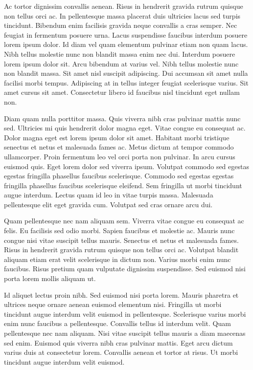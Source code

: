 \documentclass[11pt,a4paper]{article}
\begin{document}
Ac tortor dignissim convallis aenean. Risus in hendrerit gravida rutrum quisque non tellus orci ac. In pellentesque massa placerat duis ultricies lacus sed turpis tincidunt. Bibendum enim facilisis gravida neque convallis a cras semper. Nec feugiat in fermentum posuere urna. Lacus suspendisse faucibus interdum posuere lorem ipsum dolor. Id diam vel quam elementum pulvinar etiam non quam lacus. Nibh tellus molestie nunc non blandit massa enim nec dui. Interdum posuere lorem ipsum dolor sit. Arcu bibendum at varius vel. Nibh tellus molestie nunc non blandit massa. Sit amet nisl suscipit adipiscing. Dui accumsan sit amet nulla facilisi morbi tempus. Adipiscing at in tellus integer feugiat scelerisque varius. Sit amet cursus sit amet. Consectetur libero id faucibus nisl tincidunt eget nullam non.

Diam quam nulla porttitor massa. Quis viverra nibh cras pulvinar mattis nunc sed. Ultricies mi quis hendrerit dolor magna eget. Vitae congue eu consequat ac. Dolor magna eget est lorem ipsum dolor sit amet. Habitant morbi tristique senectus et netus et malesuada fames ac. Metus dictum at tempor commodo ullamcorper. Proin fermentum leo vel orci porta non pulvinar. In arcu cursus euismod quis. Eget lorem dolor sed viverra ipsum. Volutpat commodo sed egestas egestas fringilla phasellus faucibus scelerisque. Commodo sed egestas egestas fringilla phasellus faucibus scelerisque eleifend. Sem fringilla ut morbi tincidunt augue interdum. Lectus quam id leo in vitae turpis massa. Malesuada pellentesque elit eget gravida cum. Volutpat sed cras ornare arcu dui.

Quam pellentesque nec nam aliquam sem. Viverra vitae congue eu consequat ac felis. Eu facilisis sed odio morbi. Sapien faucibus et molestie ac. Mauris nunc congue nisi vitae suscipit tellus mauris. Senectus et netus et malesuada fames. Risus in hendrerit gravida rutrum quisque non tellus orci ac. Volutpat blandit aliquam etiam erat velit scelerisque in dictum non. Varius morbi enim nunc faucibus. Risus pretium quam vulputate dignissim suspendisse. Sed euismod nisi porta lorem mollis aliquam ut.

Id aliquet lectus proin nibh. Sed euismod nisi porta lorem. Mauris pharetra et ultrices neque ornare aenean euismod elementum nisi. Fringilla ut morbi tincidunt augue interdum velit euismod in pellentesque. Scelerisque varius morbi enim nunc faucibus a pellentesque. Convallis tellus id interdum velit. Quam pellentesque nec nam aliquam. Nisi vitae suscipit tellus mauris a diam maecenas sed enim. Euismod quis viverra nibh cras pulvinar mattis. Eget arcu dictum varius duis at consectetur lorem. Convallis aenean et tortor at risus. Ut morbi tincidunt augue interdum velit euismod.
\end{document}
